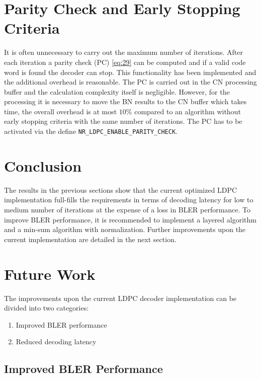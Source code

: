 \documentclass{article}
\begin{document}
\section{Parity Check and Early Stopping Criteria}
It is often unnecessary to carry out the maximum number of iterations. After each iteration a parity check (PC) \eqref{eq:29} can be computed and if a valid code word is found the decoder can stop. This functionality has been implemented and the additional overhead is reasonable. The PC is carried out in the CN processing buffer and the calculation complexity itself is negligible. However, for the processing it is necessary to move the BN results to the CN buffer which takes time, the overall overhead is at most $10\%$ compared to an algorithm without early stopping criteria with the same number of iterations. The PC has to be activated via the define \texttt{NR\_LDPC\_ENABLE\_PARITY\_CHECK}.


\section{Conclusion}
\label{sec:conclusion}

The results in the previous sections show that the current optimized LDPC implementation full-fills the requirements in terms of decoding latency for low to medium number of iterations at the expense of a loss in BLER performance. To improve BLER performance, it is recommended to implement a layered algorithm and a min-sum algorithm with normalization. Further improvements upon the current implementation are detailed in the next section.

\newpage
\section{Future Work}
\label{sec:future-work}

The improvements upon the current LDPC decoder implementation can be divided into two categories:
\begin{enumerate}
\item Improved BLER performance
\item Reduced decoding latency
\end{enumerate}

\subsection{Improved BLER Performance}
\label{sec:impr-bler-perf}
\end{document}

